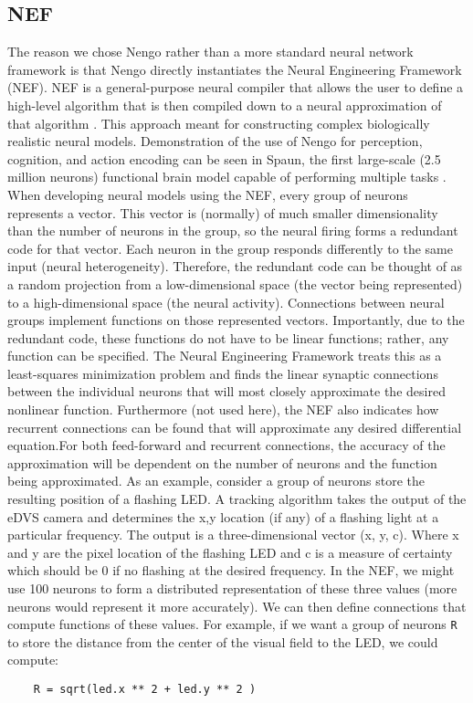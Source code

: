 \documentclass[conference]{IEEEtran}
\begin{document}
\subsection{NEF}
The reason we chose Nengo rather than a more standard neural network framework is that Nengo \cite{bekolay_nengo2014} directly instantiates the Neural Engineering Framework (NEF). NEF is a general-purpose neural compiler that allows the user to define a high-level algorithm that is then compiled down to a neural approximation of that algorithm \cite{eliasmith2004neural}. This approach meant for constructing complex biologically realistic neural models. Demonstration of the use of Nengo for perception, cognition, and action encoding can be seen in Spaun, the first large-scale (2.5 million neurons) functional brain model capable of performing multiple tasks  \cite{eliasmith_largescale_2012}. When developing neural models using the NEF, every group of neurons represents a vector. This vector is (normally) of much smaller dimensionality than the number of neurons in the group, so the neural firing forms a redundant code for that vector. Each neuron in the group responds differently to the same input (neural heterogeneity). Therefore, the redundant code can be thought of as a random projection from a low-dimensional space (the vector being represented) to a high-dimensional space (the neural activity). Connections between neural groups implement functions on those represented vectors. Importantly, due to the redundant code, these functions do not have to be linear functions; rather, any function can be specified. The Neural Engineering Framework treats this as a least-squares minimization problem and finds the linear synaptic connections between the individual neurons that will most closely approximate the desired nonlinear function. Furthermore (not used here), the NEF also indicates how recurrent connections can be found that will approximate any desired differential equation.For both feed-forward and recurrent connections, the accuracy of the approximation will be dependent on the number of neurons and the function being approximated. As an example, consider a group of neurons store the resulting position of a flashing LED. A tracking algorithm takes the output of the eDVS camera and determines the x,y location (if any) of a flashing light at a particular frequency. The output is a three-dimensional vector (x, y, c). Where x and y are the pixel location of the flashing LED and c is a measure of certainty which should be 0 if no flashing at the desired frequency. In the NEF, we might use 100 neurons to form a distributed representation of these three values (more neurons would represent it more accurately). We can then define connections that compute functions of these values. For example, if we want a group of neurons \texttt{R} to store the distance from the center of the visual field to the LED, we could compute: 
\begin{lstlisting}
	R = sqrt(led.x ** 2 + led.y ** 2 )
\end{lstlisting}
\end{document}
